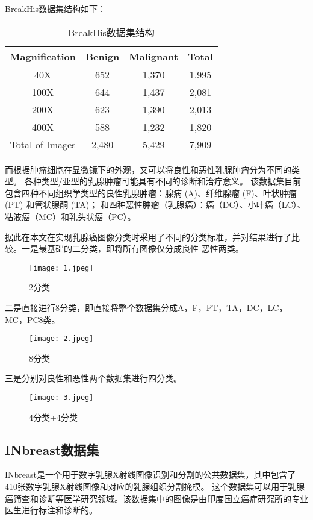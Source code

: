 \documentclass[AutoFakeBold]{LZUThesis}
\begin{document}
BreakHis数据集结构如下：


\begin{table}[H]
    \centering
    \caption{BreakHis数据集结构}
    \begin{tabular}{|c|c|c|c|} %
    \hline
    Magnification & Benign & Malignant & Total\\
    \hline
    40X & 652 & 1,370 & 1,995\\
    \hline
    100X & 644 & 1,437 & 2,081\\
    \hline
    200X & 623 & 1,390 & 2,013\\
    \hline
    400X & 588 & 1,232 & 1,820\\
    \hline
    Total of Images & 2,480 & 5,429 & 7,909\\
    \hline
    \end{tabular}
    \label{tbl_mos1_nanotube}



\end{table}

而根据肿瘤细胞在显微镜下的外观，又可以将良性和恶性乳腺肿瘤分为不同的类型。
各种类型/亚型的乳腺肿瘤可能具有不同的诊断和治疗意义。
该数据集目前包含四种不同组织学类型的良性乳腺肿瘤：腺病 (A)、纤维腺瘤 (F)、叶状肿瘤 (PT) 和管状腺酮 (TA)；
和四种恶性肿瘤（乳腺癌）：癌（DC）、小叶癌（LC）、粘液癌（MC）和乳头状癌（PC）。
 
据此在本文在实现乳腺癌图像分类时采用了不同的分类标准，并对结果进行了比较。一是最基础的二分类，即将所有图像仅分成良性
恶性两类。

\begin{figure}[H]
    \centering
    \texttt{[image: 1.jpeg]}
    \caption{2分类}
    \label{figure}
 \end{figure}
  

二是直接进行8分类，即直接将整个数据集分成A，F，PT，TA，DC，LC，MC，PC8类。

\begin{figure}[H]
    \centering
    \texttt{[image: 2.jpeg]}
    \caption{8分类}
    \label{figure}
 \end{figure}


三是分别对良性和恶性两个数据集进行四分类。

\begin{figure}[H]
    \centering
    \texttt{[image: 3.jpeg]}
    \caption{4分类+4分类}
    \label{figure}
 \end{figure}


\subsection{INbreast数据集}
INbreast是一个用于数字乳腺X射线图像识别和分割的公共数据集，其中包含了410张数字乳腺X射线图像和对应的乳腺组织分割掩模。
这个数据集可以用于乳腺癌筛查和诊断等医学研究领域。该数据集中的图像是由印度国立癌症研究所的专业医生进行标注和诊断的。
\end{document}
